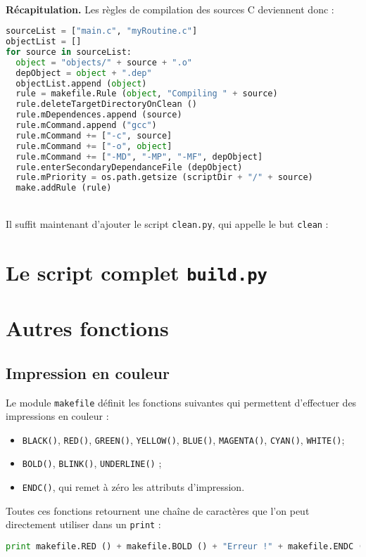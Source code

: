 \documentclass[a4paper,12pt,obeyspaces,openany]{extarticle}
\begin{document}
~\\{\bf Récapitulation.} Les règles de compilation des sources C deviennent donc :
\begin{lstlisting}[language=py]
sourceList = ["main.c", "myRoutine.c"]
objectList = []
for source in sourceList:
  object = "objects/" + source + ".o"
  depObject = object + ".dep"
  objectList.append (object)
  rule = makefile.Rule (object, "Compiling " + source)
  rule.deleteTargetDirectoryOnClean ()
  rule.mDependences.append (source)
  rule.mCommand.append ("gcc")
  rule.mCommand += ["-c", source]
  rule.mCommand += ["-o", object]
  rule.mCommand += ["-MD", "-MP", "-MF", depObject]
  rule.enterSecondaryDependanceFile (depObject)
  rule.mPriority = os.path.getsize (scriptDir + "/" + source)
  make.addRule (rule)
\end{lstlisting}

~\\Il suffit maintenant d'ajouter le script \texttt{clean.py}, qui appelle le but \texttt{clean} :



\section{Le script complet \texttt{build.py}}









\section{Autres fonctions}

\subsection{Impression en couleur}

Le module \texttt{makefile} définit les fonctions suivantes qui permettent d'effectuer des impressions en couleur :
\begin{itemize}
  \item \texttt{BLACK()}, \texttt{RED()}, \texttt{GREEN()}, \texttt{YELLOW()}, \texttt{BLUE()}, \texttt{MAGENTA()}, \texttt{CYAN()}, \texttt{WHITE()};
  \item \texttt{BOLD()}, \texttt{BLINK()}, \texttt{UNDERLINE()} ;
  \item \texttt{ENDC()}, qui remet à zéro les attributs d'impression.
\end{itemize}
Toutes ces fonctions retournent une chaîne de caractères que l'on peut directement utiliser dans un \texttt{print} :
\begin{lstlisting}[language=py]
print makefile.RED () + makefile.BOLD () + "Erreur !" + makefile.ENDC ()
\end{lstlisting}
\end{document}

